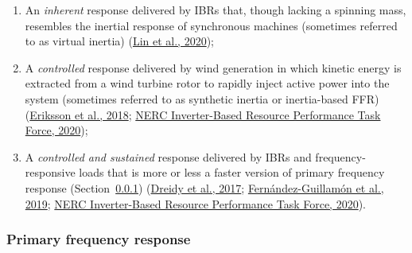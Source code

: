\documentclass[12pt,a4paper,]{report}
\providecommand{\tightlist}{%
  \setlength{\itemsep}{0pt}\setlength{\parskip}{0pt}}
\begin{document}
\begin{enumerate}
\def\labelenumi{\arabic{enumi}.}
\tightlist
\item
  An \emph{inherent} response delivered by IBRs that, though lacking a
  spinning mass, resembles the inertial response of synchronous machines
  (sometimes referred to as virtual inertia)
  (\protect\hyperlink{ref-linResearchRoadmapGridForming2020}{Lin et al.,
  2020});
\item
  A \emph{controlled} response delivered by wind generation in which
  kinetic energy is extracted from a wind turbine rotor to rapidly
  inject active power into the system (sometimes referred to as
  synthetic inertia or inertia-based FFR)
  (\protect\hyperlink{ref-erikssonSyntheticInertiaFast2018}{Eriksson et
  al., 2018};
  \protect\hyperlink{ref-nercinverter-basedresourceperformancetaskforceFastFrequencyResponse2020}{NERC
  Inverter-Based Resource Performance Task Force, 2020});
\item
  A \emph{controlled and sustained} response delivered by IBRs and
  frequency-responsive loads that is more or less a faster version of
  primary frequency response
  (Section~\ref{sec:lit_review-balancing_practices-pfr})
  (\protect\hyperlink{ref-dreidyInertiaResponseFrequency2017}{Dreidy et
  al., 2017};
  \protect\hyperlink{ref-fernandez-guillamonPowerSystemsHigh2019}{Fernández-Guillamón
  et al., 2019};
  \protect\hyperlink{ref-nercinverter-basedresourceperformancetaskforceFastFrequencyResponse2020}{NERC
  Inverter-Based Resource Performance Task Force, 2020}).
\end{enumerate}

\hypertarget{sec:lit_review-balancing_practices-pfr}{%
\subsubsection{Primary frequency
response}\label{sec:lit_review-balancing_practices-pfr}}
\end{document}
